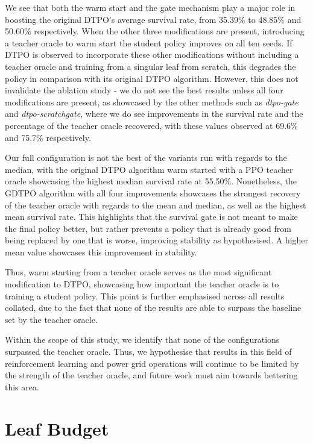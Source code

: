 We see that both the warm start and the gate mechanism play a major role in boosting the original DTPO's average survival rate, from 35.39\% to 48.85\% and 50.60\% respectively. When the other three modifications are present, introducing a teacher oracle to warm start the student policy improves on all ten seeds. If DTPO is observed to incorporate these other modifications without including a teacher oracle and training from a singular leaf from scratch, this degrades the policy in comparison with its original DTPO algorithm. However, this does not invalidate the ablation study - we do not see the best results unless all four modifications are present, as showcased by the other methods such as \textit{dtpo-gate} and \textit{dtpo-scratchgate}, where we do see improvements in the survival rate and the percentage of the teacher oracle recovered, with these values observed at 69.6\% and 75.7\% respectively.

Our full configuration is not the best of the variants run with regards to the median, with the original DTPO algorithm warm started with a PPO teacher oracle showcasing the highest median survival rate at 55.50\%. Nonetheless, the GDTPO algorithm with all four improvements showcases the strongest recovery of the teacher oracle with regards to the mean and median, as well as the highest mean survival rate. This highlights that the survival gate is not meant to make the final policy better, but rather prevents a policy that is already good from being replaced by one that is worse, improving stability as hypothesised. A higher mean value showcases this improvement in stability.
 
Thus, warm starting from a teacher oracle serves as the most significant modification to DTPO, showcasing how important the teacher oracle is to training a student policy. This point is further emphasised across all results collated, due to the fact that none of the results are able to surpass the baseline set by the teacher oracle. 

Within the scope of this study, we identify that none of the configurations surpassed the teacher oracle. Thus, we hypothesise that results in this field of reinforcement learning and power grid operations will continue to be limited by the strength of the teacher oracle, and future work must aim towards bettering this area.

\section{Leaf Budget}

